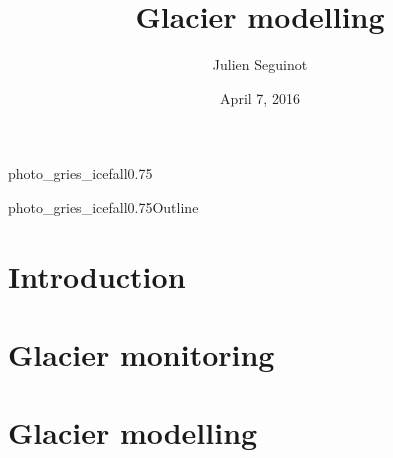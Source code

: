 


\title[Glacier modelling]{Glacier modelling}
\author[seguinot@vaw.baug.ethz.ch]{Julien Seguinot}
\date{April 7, 2016}



    \begin{backgroundframe}{photo_gries_icefall}{0.75}{}
      \maketitle
    \end{backgroundframe}

    \begin{backgroundframe}{photo_gries_icefall}{0.75}{Outline}
      \tableofcontents[hideallsubsections]
    \end{backgroundframe}

\section{Introduction}



\section{Glacier monitoring}



\section{Glacier modelling}



